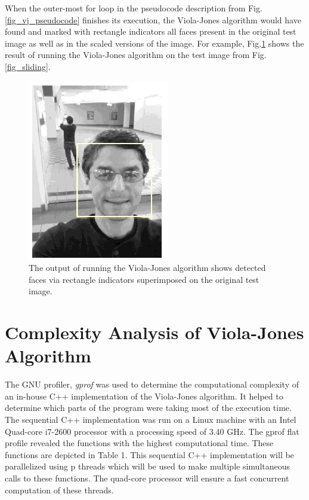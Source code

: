 \documentclass[conference]{IEEEtran}
\begin{document}
When the outer-most for loop in the pseudocode description from Fig.\ref{fig_vj_pseudocode} finishes its execution, the Viola-Jones algorithm would have found and marked with rectangle indicators all faces present in the original test image as well as in the scaled versions of the image. For example, Fig.\ref{fig_face_detection_example} shows the result of running the Viola-Jones algorithm on the test image from Fig.\ref{fig_sliding}.


\begin{figure}[!htb]
\centering
	\includegraphics[scale=1.0]{fig_face_detection_example}
\caption{The output of running the Viola-Jones algorithm shows detected faces via rectangle indicators superimposed on the original test image.}
\label{fig_face_detection_example}
\end{figure}




\section {Complexity Analysis of Viola-Jones Algorithm}

The GNU profiler, {\it gprof} was used to determine the computational complexity of an in-house C++ implementation of the Viola-Jones algorithm. It helped to determine which parts of the program were taking most of the execution time. The sequential C++ implementation was run on a Linux machine with an Intel Quad-core i7-2600 processor with a processing speed of 3.40 GHz. The gprof flat profile revealed the functions with the highest computational time. These functions are depicted in Table 1. This sequential C++ implementation will be parallelized using p threads which will be used to make multiple simultaneous calls to these functions. The quad-core processor will ensure a fast concurrent computation of these threads.
\end{document}
